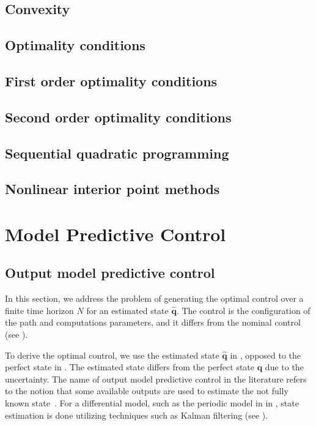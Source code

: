 \subsection{\color{red}Convexity}

\subsection{\color{red}Optimality conditions}

\subsection{\color{orange}First order optimality conditions}

\subsection{\color{orange}Second order optimality conditions}

\subsection{\color{orange}Sequential quadratic programming}

\subsection{\color{orange}Nonlinear interior point methods}


\section{\color{red}Model Predictive Control}



\subsection{Output model predictive control}
\label{sec:output-mpc}

In this section, we address the problem of generating the optimal control over a finite time horizon $N$ for an estimated state $\hat{\mathbf{q}}$. The control is the configuration of the path and computations parameters, and it differs from the nominal control (see ). 

To derive the optimal control, we use the estimated state $\hat{\mathbf{q}}$ in , opposed to the perfect state in . The estimated state differs from the perfect state $\mathbf{q}$ due to the uncertainty. The name of output model predictive control in the literature refers to the notion that some available outputs are used to estimate the not fully known state~\citep{rawlings2017model}. For a differential model, such as the periodic model in  in , state estimation is done utilizing techniques such as Kalman filtering (see ).

